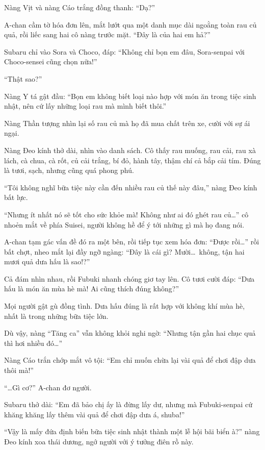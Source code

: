 \documentclass[../main.tex]{subfiles}
\begin{document}
Nàng Vịt và nàng Cáo trắng đồng thanh: ``Dạ?''

A-chan cầm tờ hóa đơn lên, mắt lướt qua một danh mục dài ngoằng toàn rau củ quả, rồi liếc sang hai cô nàng trước mặt. ``Đây là của hai em hả?''

Subaru chỉ vào Sora và Choco, đáp: ``Không chỉ bọn em đâu, Sora-senpai với Choco-sensei cũng chọn nữa!''

``Thật sao?''

Nàng Y tá gật đầu: ``Bọn em không biết loại nào hợp với món ăn trong tiệc sinh nhật, nên cứ lấy những loại rau mà mình biết thôi.''

Nàng Thần tượng nhìn lại số rau củ mà họ đã mua chất trên xe, cười với sự ái ngại.

Nàng Đeo kính thở dài, nhìn vào danh sách. Cô thấy rau muống, rau cải, rau xà lách, cà chua, cà rốt, củ cải trắng, bí đỏ, hành tây, thậm chí cả bắp cải tím. Đúng là tươi, sạch, nhưng cũng quá phong phú.

``Tôi không nghĩ bữa tiệc này cần đến nhiều rau củ thế này đâu,'' nàng Đeo kính bất lực.

``Nhưng ít nhất nó sẽ tốt cho sức khỏe mà! Không như ai đó ghét rau củ\dots'' cô nhoẻn mắt về phía Suisei, người không hề để ý tới những gì mà họ đang nói.

A-chan tạm gác vấn đề đó ra một bên, rồi tiếp tục xem hóa đơn: ``Được rồi\dots'' rồi bất chợt, nheo mắt lại đầy ngỡ ngàng: ``Đây là cái gì? Mười\dots\ không, tận hai mươi quả dưa hấu là sao!?''

Cả đám nhìn nhau, rồi Fubuki nhanh chóng giơ tay lên. Cô tươi cười đáp: ``Dưa hấu là món ăn mùa hè mà! Ai cũng thích đúng không?''

Mọi người gật gù đồng tình. Dưa hấu đúng là rất hợp với không khí mùa hè, nhất là trong những bữa tiệc lớn.

Dù vậy, nàng ``Tăng ca'' vẫn không khỏi nghi ngờ: ``Nhưng tận gần hai chục quả thì hơi nhiều đó\dots''

Nàng Cáo trắn chớp mắt vô tội: ``Em chỉ muốn chừa lại vài quả để chơi đập dưa thôi mà!''

``\dots Gì cơ?'' A-chan đơ người.

Subaru thở dài: ``Em đã bảo chị ấy là đừng lấy dư, nhưng mà Fubuki-senpai cứ khăng khăng lấy thêm vài quả để chơi đập dưa á, shuba!''

``Vậy là mấy đứa định biến bữa tiệc sinh nhật thành một lễ hội bãi biển à?'' nàng Đeo kính xoa thái dương, ngớ người với ý tưởng điên rồ này.
\end{document}
